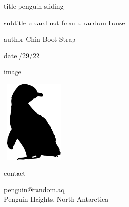 \documentclass[12pt]{article}
\begin{document}
%
\begin{staticcontents*}{title}
\titlespecs
penguin sliding
\end{staticcontents*}

\begin{staticcontents*}{subtitle}
\subtitlespecs
a card not from a random house
\end{staticcontents*}

\begin{staticcontents*}{author}
\authorspecs
Chin Boot Strap\\
\end{staticcontents*}

\begin{staticcontents*}{date}
 /29/22
\end{staticcontents*} %

\begin{staticcontents*}{image}
 \imagespecs

\includegraphics[width=32.9mm,height=40.9mm]{image.png}

\end{staticcontents*} %

\begin{staticcontents*}{contact}
 \contactspecs

penguin@random.aq\\
Penguin Heights, North Antarctica

\end{staticcontents*} %
\end{document}
